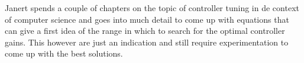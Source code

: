 Janert spends a couple of chapters on the topic of controller tuning in de context of computer science \cite{janert2013-feedback} and goes into much detail to come up with equations that can give a first idea of the range in which to search for the optimal controller gains. This however are just an indication and still require experimentation to come up with the best solutions.
